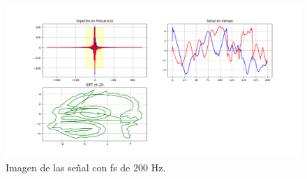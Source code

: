 \documentclass[
    11pt,
    spanish,
	a4paper
]{article}
\begin{document}
\begin{figure}[htbp]
	\centering
	\includegraphics[width=\textwidth]{img/homero200.png}
	\caption{Imagen de las señal con fs de 200 Hz.}
	\label{fig:ifdt}
\end{figure}
\end{document}
